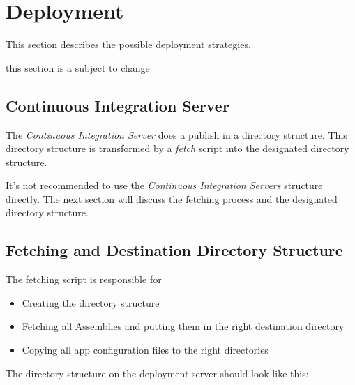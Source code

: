 \section{\label{Deployment}Deployment}
This section describes the possible deployment strategies. 

\begin{note}
this section is a subject to change
\end{note} 

\subsection{Continuous Integration Server}
The \emph{Continuous Integration Server} does a publish in a directory
structure. This directory structure is transformed by a \emph{fetch} script into the designated
directory structure.

It's not recommended to use the \emph{Continuous Integration Servers} structure
directly. The next section will discuss the fetching process and the designated
directory structure.

\subsection{Fetching and Destination Directory Structure}

The fetching script is responsible for
\begin{itemize}
  \item Creating the directory structure
  \item Fetching all Assemblies and putting them in the right destination
  directory
  \item Copying all app configuration files to the right directories 
\end{itemize} 

The directory structure on the deployment server should look like this:

